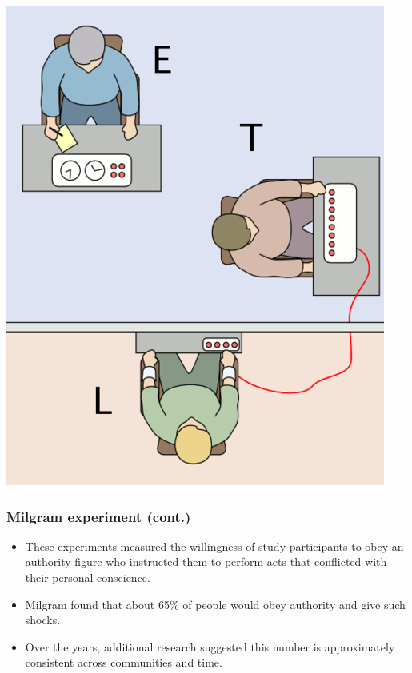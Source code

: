 \begin{frame}
{}
{
\begin{center}
\includegraphics[width=\textwidth]{3-3_geometric_distribution/figures/milgram}
\end{center}
}

\end{frame}


\begin{frame}
\frametitle{Milgram experiment (cont.)}

\begin{itemize}

\item These experiments measured the willingness of study participants to obey an authority figure who instructed them to perform acts that conflicted with their personal conscience.

\item Milgram found that about 65\% of people would obey authority and give such shocks.

\item Over the years, additional research suggested this number is approximately consistent across communities and time.

\end{itemize}

\end{frame}


